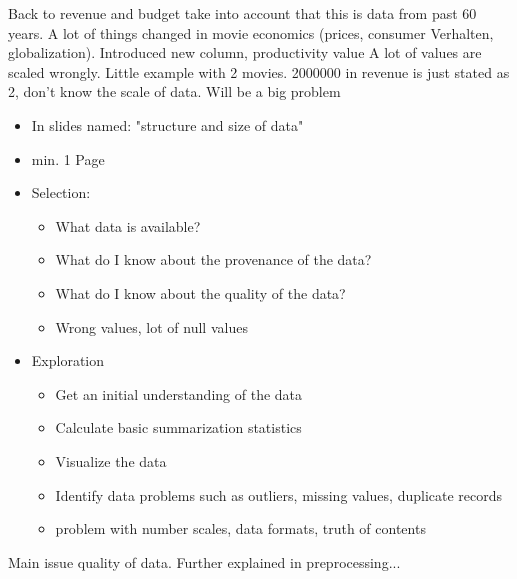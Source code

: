 Back to revenue and budget take into account that this is data from past 60 years. A lot of things changed in movie economics (prices, consumer Verhalten, globalization). Introduced new column, productivity value
A lot of values are scaled wrongly. Little example with 2 movies. 2000000 in revenue is just stated as 2, don't know the scale of data. Will be a big problem

\begin{itemize}
	\item In slides named: "structure and size of data"
	\item min. 1 Page
	\item Selection: 
	\begin{itemize}
		\item What data is available?
		\item What do I know about the provenance of the data?
		\item What do I know about the quality of the data?
		\item Wrong values, lot of null values
	\end{itemize}
	\item Exploration
	\begin{itemize}
		\item Get an initial understanding of the data
		\item Calculate basic summarization statistics
		\item Visualize the data
		\item Identify data problems such as outliers, missing values, duplicate records
		\item problem with number scales, data formats, truth of contents
	\end{itemize}
\end{itemize}

Main issue quality of data. Further explained in preprocessing...

